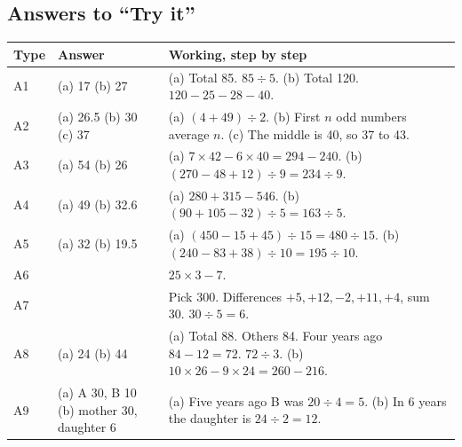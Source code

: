 \documentclass[11pt,a4paper]{article}
\let\oldsubsection\subsection
\renewcommand{\subsection}{\needspace{9\baselineskip}\oldsubsection}
\begin{document}
\subsection*{Answers to ``Try it''}
\begin{center}\small\renewcommand{\arraystretch}{1.25}\setlength{\tabcolsep}{8pt}
\begin{tabularx}{\linewidth}{@{}l>{\raggedright\arraybackslash}p{3.4cm}>{\raggedright\arraybackslash}X@{}}
\toprule
\textbf{\color{slate}Type} & \textbf{\color{slate}Answer} & \textbf{\color{slate}Working, step by step} \\ \midrule
A1 & (a) 17 \newline (b) 27 & (a) Total 85. $85 \div 5$. \newline (b) Total 120. $120 - 25 - 28 - 40$. \\
A2 & (a) 26.5 \newline (b) 30 \newline (c) 37 & (a) $(4 + 49) \div 2$. \newline (b) First $n$ odd numbers average $n$. \newline (c) The middle is 40, so 37 to 43. \\
A3 & (a) 54 \newline (b) 26 & (a) $7 \times 42 - 6 \times 40 = 294 - 240$. \newline (b) $(270 - 48 + 12) \div 9 = 234 \div 9$. \\
A4 & (a) 49 \newline (b) 32.6 & (a) $280 + 315 - 546$. \newline (b) $(90 + 105 - 32) \div 5 = 163 \div 5$. \\
A5 & (a) 32 \newline (b) 19.5 & (a) $(450 - 15 + 45) \div 15 = 480 \div 15$. \newline (b) $(240 - 83 + 38) \div 10 = 195 \div 10$. \\
A6 & 68 & $25 \times 3 - 7$. \\
A7 & 306 & Pick 300. Differences $+5, +12, -2, +11, +4$, sum 30. \newline $30 \div 5 = 6$. \\
A8 & (a) 24 \newline (b) 44 & (a) Total 88. Others 84. Four years ago $84 - 12 = 72$. $72 \div 3$. \newline (b) $10 \times 26 - 9 \times 24 = 260 - 216$. \\
A9 & (a) A 30, B 10 \newline (b) mother 30, daughter 6 & (a) Five years ago B was $20 \div 4 = 5$. \newline (b) In 6 years the daughter is $24 \div 2 = 12$. \\

\end{tabularx}
\end{center}
\end{document}
